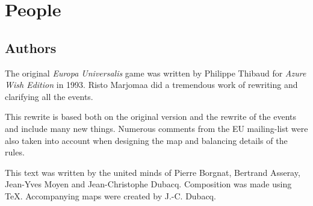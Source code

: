 

\chapter*{People}

\section*{Authors}

The original \emph{Europa Universalis} game was written by Philippe Thibaud
for \emph{Azure Wish Edition} in 1993. Risto Marjomaa did a tremendous work of
rewriting and clarifying all the events.

This rewrite is based both on the original version and the rewrite of the
events and include many new things. Numerous comments from the EU mailing-list
were also taken into account when designing the map and balancing details of
the rules.

This text was written by the united minds of Pierre Borgnat, Bertrand Asseray,
Jean-Yves Moyen and Jean-Christophe Dubacq. Composition was made using
\TeX. Accompanying maps were created by J.-C. Dubacq.


